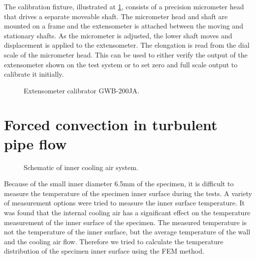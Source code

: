 The calibration fixture, illustrated at \ref{Fig:Calibration}, consists of a precision micrometer head that drives a separate moveable shaft.
The micrometer head and shaft are mounted on a frame and the extensometer is attached between the moving and stationary shafts.
As the micrometer is adjusted, the lower shaft moves and displacement is applied to the extensometer.
The elongation is read from the dial scale of the micrometer head. This can be used to either verify the output of the extensometer shown on the test system or to set zero and full scale output to calibrate it initially.
\begin{figure}[!htp]
\caption{Extensometer calibrator GWB-200JA.}
\label{Fig:Calibration}
\end{figure}

\section{Forced convection in turbulent pipe flow}

\begin{figure}[!htp]
\centering{}
\caption{Schematic of inner cooling air system.}
\label{Fig:}
\end{figure}

Because of the small inner diameter 6.5mm of the specimen, it is difficult to measure the temperature of the specimen inner surface during the tests.
A variety of measurement options were tried to measure the inner surface temperature.
It was found that the internal cooling air has a significant effect on the temperature measurement of the inner surface of the specimen.
The measured temperature is not the temperature of the inner surface, but the average temperature of the wall and the cooling air flow.
Therefore we tried to calculate the temperature distribution of the specimen inner surface using the FEM method.

